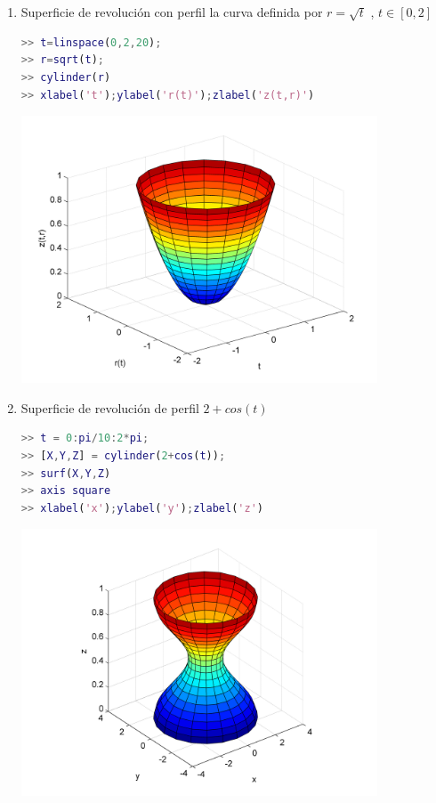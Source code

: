 \begin{enumerate}

\item Superficie de revolución con perfil la curva definida por $r= \sqrt{t}$ , $t \in [0,2]$
\begin{lstlisting}[language=Matlab]
>> t=linspace(0,2,20); 
>> r=sqrt(t); 
>> cylinder(r) 
>> xlabel('t');ylabel('r(t)');zlabel('z(t,r)')
\end{lstlisting}
\includegraphics[width=300pt]{./Imagenes/supfparam1.png}


\item Superficie de revolución de perfil $2 + cos(t)$
\begin{lstlisting}[language=Matlab]
>> t = 0:pi/10:2*pi; 
>> [X,Y,Z] = cylinder(2+cos(t)); 
>> surf(X,Y,Z) 
>> axis square 
>> xlabel('x');ylabel('y');zlabel('z')
\end{lstlisting}
\includegraphics[width=300pt]{./Imagenes/supfparam2.png}


\end{enumerate}

